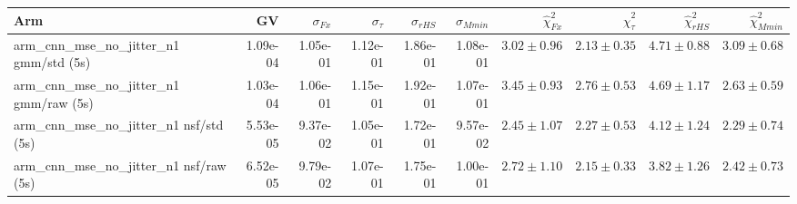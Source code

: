 \begin{tabular}{lrrrrrrrrr}
\toprule
Arm & GV & $\sigma_{Fx}$ & $\sigma_{\tau}$ & $\sigma_{rHS}$ & $\sigma_{Mmin}$ & $\hat\chi^2_{Fx}$ & $\hat\chi^2_{\tau}$ & $\hat\chi^2_{rHS}$ & $\hat\chi^2_{Mmin}$ \\
\midrule
arm_cnn_mse_no_jitter_n1 gmm/std (5s) & 1.09e-04 & 1.05e-01 & 1.12e-01 & 1.86e-01 & 1.08e-01 & $3.02\pm0.96$ & $2.13\pm0.35$ & $4.71\pm0.88$ & $3.09\pm0.68$ \\
arm_cnn_mse_no_jitter_n1 gmm/raw (5s) & 1.03e-04 & 1.06e-01 & 1.15e-01 & 1.92e-01 & 1.07e-01 & $3.45\pm0.93$ & $2.76\pm0.53$ & $4.69\pm1.17$ & $2.63\pm0.59$ \\
arm_cnn_mse_no_jitter_n1 nsf/std (5s) & 5.53e-05 & 9.37e-02 & 1.05e-01 & 1.72e-01 & 9.57e-02 & $2.45\pm1.07$ & $2.27\pm0.53$ & $4.12\pm1.24$ & $2.29\pm0.74$ \\
arm_cnn_mse_no_jitter_n1 nsf/raw (5s) & 6.52e-05 & 9.79e-02 & 1.07e-01 & 1.75e-01 & 1.00e-01 & $2.72\pm1.10$ & $2.15\pm0.33$ & $3.82\pm1.26$ & $2.42\pm0.73$ \\
\bottomrule
\end{tabular}
